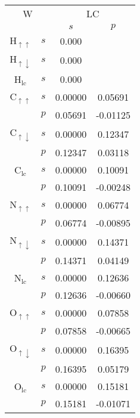 \begin{center}
  \begin{small}
\begin{tabular}{|cc|cc|} \hline
\multicolumn{2}{|c|}{W}
   & \multicolumn{2}{c|}{LC}       \\ \cline{3-4}
   &     &    $s$ & $p$    \\ \hline
H$_{\uparrow\uparrow}$
   & $s$ &  0.000 &\\\cline{3-4}
H$_{\uparrow\downarrow}$
   & $s$ &  0.000 &\\\cline{3-4}
H$_\text{lc}$
   & $s$ &  0.000 &\\\hline
C$_{\uparrow\uparrow}$
   & $s$ &  0.00000&  0.05691\\
   & $p$ &  0.05691& -0.01125\\\cline{3-4}
C$_{\uparrow\downarrow}$
   & $s$ &  0.00000&  0.12347\\
   & $p$ &  0.12347&  0.03118\\\cline{3-4}
C$_\text{lc}$
   & $s$ &  0.00000&  0.10091\\
   & $p$ &  0.10091& -0.00248\\\hline
N$_{\uparrow\uparrow}$
   & $s$ &  0.00000&  0.06774\\
   & $p$ &  0.06774& -0.00895\\\cline{3-4}
N$_{\uparrow\downarrow}$
   & $s$ &  0.00000&  0.14371\\
   & $p$ &  0.14371&  0.04149\\\cline{3-4}
N$_\text{lc}$
   & $s$ &  0.00000&  0.12636\\
   & $p$ &  0.12636& -0.00660\\\hline
O$_{\uparrow\uparrow}$
   & $s$ &  0.00000&  0.07858\\
   & $p$ &  0.07858& -0.00665\\\cline{3-4}
O$_{\uparrow\downarrow}$
   & $s$ &  0.00000&  0.16395\\
   & $p$ &  0.16395&  0.05179\\\cline{3-4}
O$_\text{lc}$
   & $s$ &  0.00000&  0.15181\\
   & $p$ &  0.15181& -0.01071\\\hline
\end{tabular}
\end{small}
\end{center}

